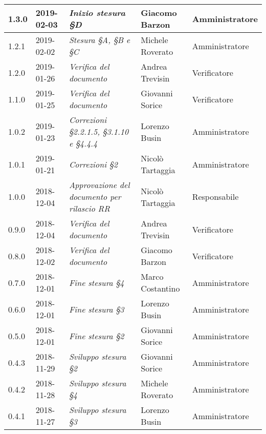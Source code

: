 \begin{longtable}{C{2cm}|C{2.5cm}|C{4.5cm}|C{2.5cm}|C{3cm}}
		1.3.0 & 2019-02-03 & \emph{Inizio stesura §D} & Giacomo Barzon & Amministratore  \\
		\hline
		
		1.2.1 & 2019-02-02 & \emph{Stesura §A, §B e §C} & Michele Roverato & Amministratore  \\
		\hline
		
		1.2.0 & 2019-01-26 & \emph{Verifica del documento} & Andrea Trevisin & Verificatore  \\
		\hline
		
		1.1.0 & 2019-01-25 & \emph{Verifica del documento} & Giovanni Sorice & Verificatore  \\
		\hline
		
		1.0.2 & 2019-01-23 & \emph{Correzioni §2.2.1.5, §3.1.10 e §4.4.4} & Lorenzo Busin & Amministratore \\
		\hline
		
		1.0.1 & 2019-01-21 & \emph{Correzioni §2} & Nicolò Tartaggia & Amministratore  \\
		\hline
		
		1.0.0  & 2018-12-04 & \emph{Approvazione del documento per rilascio RR} & Nicolò Tartaggia & Responsabile \\
		\hline
		
		0.9.0 & 2018-12-04 &\emph{Verifica del documento} & Andrea Trevisin & Verificatore \\
		\hline
		
	    0.8.0 & 2018-12-02 & \emph{Verifica del documento} & Giacomo Barzon & Verificatore  \\
		\hline
		
		0.7.0 & 2018-12-01 & \emph{Fine stesura §4} & Marco Costantino & Amministratore  \\
		\hline
		
		0.6.0 & 2018-12-01 & \emph{Fine stesura §3} & Lorenzo Busin & Amministratore  \\
		\hline
		
	 	0.5.0 & 2018-12-01 & \emph{Fine stesura §2} & Giovanni Sorice & Amministratore  \\
		\hline
		
		0.4.3 & 2018-11-29 & \emph{Sviluppo stesura §2} & Giovanni Sorice & Amministratore  \\
		\hline
		
		0.4.2 & 2018-11-28 & \emph{Sviluppo stesura §4} & Michele Roverato & Amministratore  \\
		\hline
		
		 0.4.1 & 2018-11-27 &\emph{Sviluppo stesura §3} & Lorenzo Busin & Amministratore \\
		\hline
		

\end{longtable}
